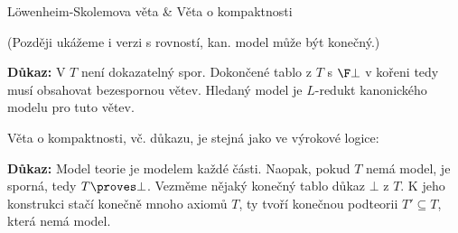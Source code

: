 \documentclass{beamer}
\begin{document}
\begin{frame}{Löwenheim-Skolemova věta \& Věta o kompaktnosti}
    
    \medskip
    
    \pause

    \pause
    (Později ukážeme i verzi s rovností, kan. model může být konečný.)

    \pause
    \textbf{Důkaz:} V $T$ není dokazatelný spor. Dokončené tablo z $T$ s $\F\bot$ v kořeni tedy musí obsahovat bezespornou větev. Hledaný model je $L$-redukt kanonického modelu pro tuto větev.\hfill\qedsymbol

    \bigskip

    \pause
    Věta o kompaktnosti, vč. důkazu, je stejná jako ve výrokové logice:

    \pause
    \smallskip
    
    \pause
    \textbf{Důkaz:} Model teorie je modelem každé části. Naopak, pokud $T$ nemá model, je sporná, tedy $T\proves\bot$. Vezměme nějaký \alert{konečný} tablo důkaz $\bot$ z $T$. K jeho konstrukci stačí konečně mnoho axiomů $T$, ty tvoří konečnou podteorii $T'\subseteq T$, která nemá model.\hfill\qedsymbol

\end{frame}
\end{document}
